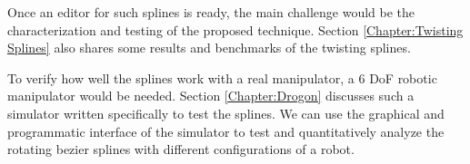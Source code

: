 {{        Once an editor for such splines is ready, the main challenge would be the characterization and testing of the proposed technique. Section \ref{Chapter:Twisting Splines} also shares some results and benchmarks of the twisting splines.

        To verify how well the splines work with a real manipulator, a $6$ DoF robotic manipulator would be needed. Section \ref{Chapter:Drogon} discusses such a simulator written specifically to test the splines. We can use the graphical and programmatic interface of the simulator to test and quantitatively analyze the rotating bezier splines with different configurations of a robot.
    }
}
